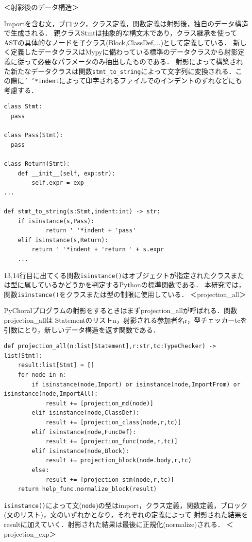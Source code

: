 \documentclass{thesis}
\begin{document}
＜射影後のデータ構造＞

Importを含む文，ブロック，クラス定義，関数定義は射影後，独自のデータ構造で生成される．
親クラス\textsf{Stmt}は抽象的な構文木であり，クラス継承を使ってASTの具体的なノードを子クラス(\textsf{Block,ClassDef,...})として定義している．
新しく定義したデータクラスはMypyに備わっている標準のデータクラスから射影定義に従って必要なパラメータのみ抽出したものである．
射影によって構築された新たなデータクラスは関数\texttt{stmt\_to\_string}によって文字列に変換される．この際に\texttt{' '*indent}によって印字されるファイルでのインデントのずれなどにも考慮する．
\begin{lstlisting}[caption=data.py,label=data]
class Stmt:
  pass

class Pass(Stmt):
  pass

class Return(Stmt):
    def __init__(self, exp:str):
        self.expr = exp
... 

def stmt_to_string(s:Stmt,indent:int) -> str:
    if isinstance(s,Pass):
            return ' '*indent + 'pass'
    elif isinstance(s,Return):
        return ' '*indent + 'return ' + s.expr
    ...
\end{lstlisting}

13,14行目に出てくる関数\texttt{isinstance()}はオブジェクトが指定されたクラスまたは型に属しているかどうかを判定するPythonの標準関数である．
本研究では，関数\texttt{isinstance()}をクラスまたは型の制限に使用している．
＜projection\_all＞

PyChoralプログラムの射影をするときはまず\textsf{projection\_all}が呼ばれる．関数\textsf{projection\_all}は
Statementのリスト\textsf{n}，射影される参加者名\textsf{r}，型チェッカー\textsf{tc}を引数にとり，新しいデータ構造を返す関数である．
\begin{lstlisting}[caption=projection\_all,label=pro.py]
def projection_all(n:list[Statement],r:str,tc:TypeChecker) -> list[Stmt]:
    result:list[Stmt] = []
    for node in n:
        if isinstance(node,Import) or isinstance(node,ImportFrom) or isinstance(node,ImportAll):
            result += [projection_md(node)]
        elif isinstance(node,ClassDef):
            result += [projection_class(node,r,tc)]
        elif isinstance(node,FuncDef):
            result += [projection_func(node,r,tc)]
        elif isinstance(node,Block):
            result += projection_block(node.body,r,tc)
        else:
            result += [projection_stm(node,r,tc)]
    return help_func.normalize_block(result)
\end{lstlisting}
\texttt{isinstance()}によって文(\texttt{node})の型はimport，クラス定義，関数定義，ブロック(文のリスト)，文のいずれかとなり，それぞれの定義によって
射影された結果をresultに加えていく．射影された結果は最後に正規化(normalize)される．
＜projection\_exp＞
\end{document}
